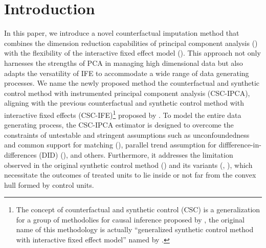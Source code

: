 \documentclass[12pt]{article}
\begin{document}
\doublespacing

\section{Introduction} 
\label{sec:introduction}
In this paper, we introduce a novel counterfactual imputation method that combines the dimension reduction capabilities of principal component analysis (\cite{jollife2016principal}) with the flexibility of the interactive fixed effect model (\cite{bai2003computation,bai2009panel}). This approach not only harnesses the strengths of PCA in managing high dimensional data but also adapts the versatility of IFE to accommodate a wide range of data generating processes. We name the newly proposed method the counterfactual and synthetic control method with instrumented principal component analysis (CSC-IPCA), aligning with the previous counterfactual and synthetic control method with interactive fixed effects (CSC-IFE)\footnote{The concept of counterfactual and synthetic control (CSC) is a generalization for a group of methodolies for causal inference proposed by \cite{chernozhukov2021exact}, the original name of this methodology is actually ``generalized synthetic control method with interactive fixed effect model'' named by \cite{xu2017generalized}.} proposed by \cite{xu2017generalized}. To model the entire data generating process, the CSC-IPCA estimator is designed to overcome the constraints of untestable and stringent assumptions such as unconfoundedness and common support for matching (\cite{abadie2011bias, abadie2006large}), parallel trend assumption for diffference-in-differences (DID) (\cite{card1993minimum}), and others. Furthermore, it addresses the limitation observed in the original synthetic control method (\cite{abadie2010synthetic}) and its variants (\cite{ben2021augmented}, \cite{arkhangelsky2021synthetic}), which necessitate the outcomes of treated units to lie inside or not far from the convex hull formed by control units. 
\end{document}
